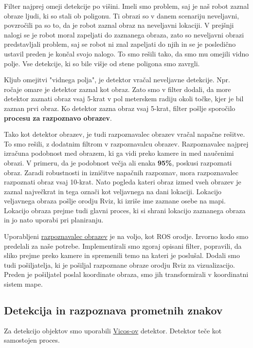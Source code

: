 \documentclass[a4paper,11pt]{article}
\begin{document}
Filter najprej omeji detekcije po višini. Imeli smo problem, saj je naš robot zaznal obraze ljudi, ki so stali ob poligonu. Ti obrazi so v danem scenariju neveljavni, povzročili pa so to, da je robot zaznal obraz na neveljavni lokaciji. V prejšnji nalogi se je robot moral zapeljati do zaznanega obraza, zato so neveljavni obrazi predstavljali problem, saj se robot ni znal zapeljati do njih in se je posledično ustavil preden je končal svojo nalogo. To smo rešili tako, da smo mu omejili vidno polje. Vse detekcije, ki so bile višje od stene poligona smo zavrgli. 

Kljub omejitvi "vidnega polja", je detektor vračal neveljavne detekcije. Npr. ročaje omare je detektor zaznal kot obraz. Zato smo v filter dodali, da more detektor zaznati obraz vsaj 5-krat v pol meterskem radiju okoli točke, kjer je bil zaznan prvi obraz. Ko detektor zazna obraz vsaj 5-krat, filter pošlje sporočilo \textbf{procesu za razpoznavo obrazev}. 

Tako kot detektor obrazev, je tudi razpoznavalec obrazev vračal napačne rešitve. To smo rešili, z dodatnim filtrom v razpoznavalcu obrazev. Razpoznavalec najprej izračuna podobnost med obrazem, ki ga vidi preko kamere in med naučenimi obrazi. V primeru, da je podobnost večja ali enaka \textbf{95\%}, poskusi razpoznati obraz. Zaradi robustnosti in izničitve napačnih razpoznav, mora razpoznavalec razpoznati obraz vsaj 10-krat. Nato pogleda kateri obraz izmed vseh obrazev je zaznal največkrat in tega označi kot veljavnega na dani lokaciji. Lokacijo veljavnega obraza pošlje orodju Rviz, ki izriše ime zaznane osebe na mapi. Lokacijo obraza prejme tudi glavni proces, ki si shrani lokacijo zaznanega obraza in jo nato uporabi pri planiranju.
 
Uporabljeni \href{http://wiki.ros.org/face_recognition}{razpoznavalec obrazev} je na voljo, kot ROS orodje. Izvorno kodo smo predelali za naše potrebe. Implementirali smo zgoraj opisani filter, popravili, da sliko prejme preko kamere in spremenili temo na kateri je poslušal. Dodali smo tudi pošiljatelja, ki je pošiljal razpoznane obraze orodju Rviz za vizualizacijo. Preden je pošiljatel poslal koordinate obraza, smo jih transformirali v koordinatni sistem mape.

\subsection{Detekcija in razpoznava prometnih znakov}

Za detekcijo objektov smo uporabili \href{https://github.com/vicoslab/vicos_ros/tree/master/detection/dlib_detector/src}{Vicos-ov} detektor. Detektor teče kot samostojen proces.
\end{document}
